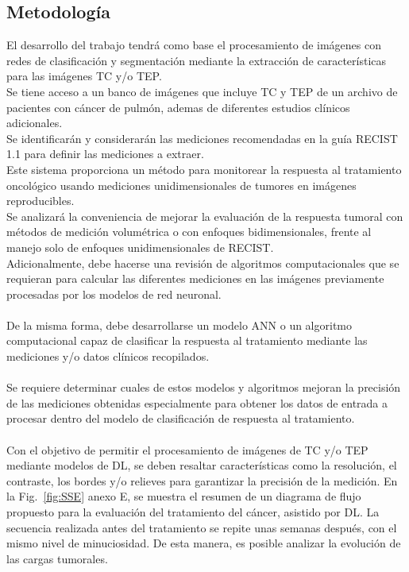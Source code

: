 \documentclass[11pt,a4paper,openany]{article}
\begin{document}
    \subsection{Metodología}

    El desarrollo del trabajo tendrá como base el procesamiento de imágenes con redes de clasificación y segmentación mediante la extracción de características para las imágenes TC y/o TEP.\\

    \noindent Se tiene acceso a un banco de imágenes que incluye TC y TEP de un archivo de pacientes con cáncer de pulmón, ademas de diferentes estudios clínicos adicionales.\\

    \noindent Se identificarán y considerarán las mediciones recomendadas en la guía RECIST 1.1 para definir las mediciones a extraer.\\

    \noindent Este sistema proporciona un método para monitorear la respuesta al tratamiento oncológico usando mediciones unidimensionales de tumores en imágenes reproducibles.\\

    \noindent Se analizará la conveniencia de mejorar la evaluación de la respuesta tumoral con métodos de medición volumétrica o con enfoques bidimensionales, frente al manejo solo de enfoques unidimensionales de RECIST.\\

    \noindent Adicionalmente, debe hacerse una revisión de algoritmos computacionales que se requieran para calcular las diferentes mediciones en las imágenes previamente procesadas por los modelos de red neuronal.\\
    \\
    De la misma forma, debe desarrollarse un modelo ANN o un algoritmo computacional capaz de clasificar la respuesta al tratamiento mediante las mediciones y/o datos clínicos recopilados.\\
    \\
    Se requiere determinar cuales de estos modelos y algoritmos mejoran la precisión de las mediciones obtenidas especialmente para obtener los datos de entrada a procesar dentro del modelo de clasificación de respuesta al tratamiento.\\
    \\
    Con el objetivo de permitir el procesamiento de imágenes de TC y/o TEP mediante modelos de DL, se deben resaltar características como la resolución, el contraste, los bordes y/o relieves para garantizar la precisión de la medición. En la Fig.~\ref{fig:SSE} anexo E, se muestra el resumen de un diagrama de flujo propuesto para la evaluación del tratamiento del cáncer, asistido por DL. La secuencia realizada antes del tratamiento se repite unas semanas después, con el mismo nivel de minuciosidad. De esta manera, es posible analizar la evolución de las cargas tumorales. \\
\end{document}
